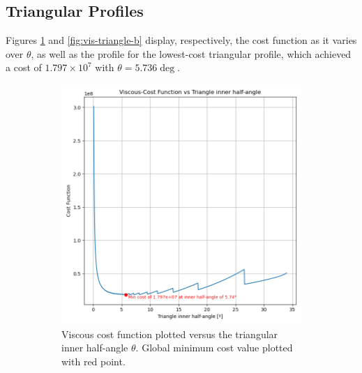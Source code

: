 \documentclass[11pt]{article}
\begin{document}
\subsection{Triangular Profiles}
Figures \ref{fig:vis-triangle-a} and \ref{fig:vis-triangle-b} display, respectively, the cost function as it varies over $\theta$, as well as the profile for the lowest-cost triangular profile, which achieved a cost of $1.797 \times 10^7$ with $\theta=5.736\deg$.
\begin{figure}[H]
\centering
\begin{subfigure}[b]{0.45\textwidth}
    \centering
    \includegraphics[width=\linewidth]{../results/viscous/triangles.png}
    \caption{Viscous cost function plotted versus the triangular inner half-angle $\theta$. Global minimum cost value plotted with red point.}
    \label{fig:vis-triangle-a}
\end{subfigure}
\hfill
\begin{subfigure}[b]{0.45\textwidth}
    \centering

\end{subfigure}
\end{figure}
\end{document}
